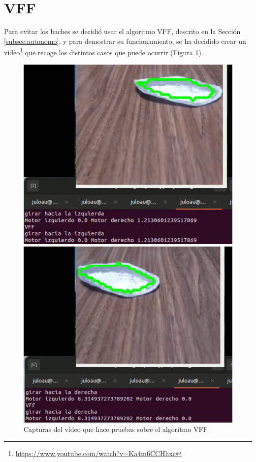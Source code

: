 \section{VFF}
\label{sec:expvff}
Para evitar los baches se decidió usar el algoritmo \ac{VFF}, descrito en la Sección \ref{subsec:autonomo}, y para demostrar su funcionamiento, se ha decidido crear un vídeo\footnote{\url{https://www.youtube.com/watch?v=Ka4m6CCHhxc}} que recoge los distintos casos que puede ocurrir (Figura \ref{fig:expvff}).  

 
\begin{figure} [h!]
	\centering
	\begin{minipage}{0.44\linewidth}
		\centering
		\includegraphics[width=\linewidth]{figs/cap7/demovff1.png}
	\end{minipage}
	\hspace{1cm}
	\begin{minipage}{0.45\linewidth}
		\centering
		\includegraphics[width=\linewidth]{figs/cap7/demovff2.png}
	\end{minipage}
	\caption{Capturas del vídeo que hace pruebas sobre el algoritmo VFF}
	\label{fig:expvff}
\end{figure}

